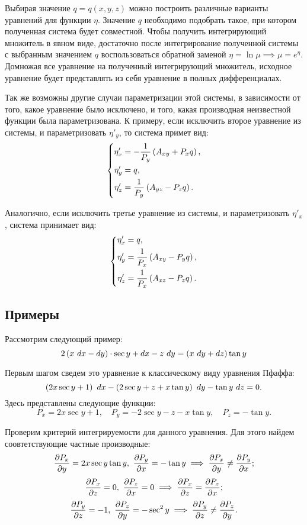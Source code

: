 	Выбирая значение $q = q(x, y, z)$ можно построить различные варианты уравнений для функции $\eta$. Значение $q$ необходимо подобрать такое, при котором полученная система будет совместной. Чтобы получить интегрирующий множитель в явном виде, достаточно после интегрирование полученной системы с выбранным значением $q$ воспользоваться обратной заменой $\eta = \ln{\mu} \implies \mu = e^{\eta}$. Домножая все уравнение на полученный интегрирующий множитель, исходное уравнение будет представлять из себя уравнение в полных дифференциалах.

	Так же возможны другие случаи параметризации этой системы, в зависимости от того, какое уравнение было исключено, и того, какая производная неизвестной функции была параметризована. К примеру, если исключить второе уравнение из системы, и параметризовать $\eta'_y$, то система примет вид:
	 \[ \left\lbrace \begin{split} 
		\eta'_x &= -\frac{1}{P_y} \left( A_{xy} + P_x q \right), \\
		\eta'_y &= q, \\
		\eta'_z &= \frac{1}{P_y} \left( A_{yz} - P_z q \right).
	\end{split} \right. \]

	Аналогично, если исключить третье уравнение из системы, и параметризовать $\eta'_x$, система принимает вид:
	\[ \left\lbrace \begin{split} 
		\eta'_x &= q, \\
		\eta'_y &= \frac{1}{P_x} \left( A_{xy} - P_y q \right), \\
		\eta'_z &= \frac{1}{P_x} \left( A_{xz} - P_z q \right).
	\end{split} \right. \]

	\subsection{Примеры}

		Рассмотрим следующий пример:
		\[ 2 \left( x ~ dx - dy \right) \cdot \sec{y} + dx - z ~ dy = \left( x ~ dy + dz \right) \tan{y} \] %

		Первым шагом сведем это уравнение к классическому виду уравнения Пфаффа:
		\[ \left( 2x \sec{y} + 1 \right) ~ dx - \left( 2 \sec{y} + z + x \tan{y} \right) ~ dy - \tan{y} ~ dz = 0. \]
		Здесь представлены следующие функции:
		\[ P_x = 2x \sec{y} + 1, \quad P_y = -2 \sec{y} - z - x \tan{y}, \quad P_z = -\tan{y}. \]

		Проверим критерий интегрируемости для данного уравнения. Для этого найдем соовтетствующие частные производные:
		\[ \dfrac{\partial P_x}{\partial y} = 2x \sec{y} \tan{y}, ~ \dfrac{\partial P_y}{\partial x} = - \tan{y} \implies \dfrac{\partial P_x}{\partial y} \neq \dfrac{\partial P_y}{\partial x}; \]
		\[ \dfrac{\partial P_x}{\partial z} = 0, ~ \dfrac{\partial P_z}{\partial x} = 0 \implies \dfrac{\partial P_x}{\partial z} = \dfrac{\partial P_z}{\partial x}; \]
		\[ \dfrac{\partial P_y}{\partial z} = -1, ~ \dfrac{\partial P_z}{\partial y} = -\sec^2{y} \implies \dfrac{\partial P_y}{\partial z} \neq \dfrac{\partial P_z}{\partial y}. \]


